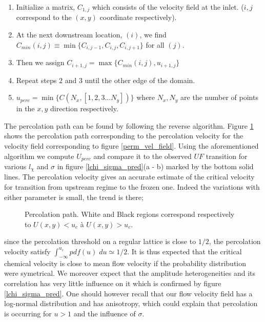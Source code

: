 \documentclass[doublecol]{epl2}
\def\figdir{./}
\begin{document}
\begin{enumerate}
 \item Initialize a matrix, $C_{1,j}$ which consists of the velocity field at the inlet. ($i,j$ correspond to the $(x,y)$ coordinate respectively).
 \item At the next downstream location, $(i)$, we find $C_{min}(i,j) \equiv \min\{C_{i,j-1},C_{i,j},C_{i,j+1}\}$ for all $(j)$.
 \item Then we assign $C_{i+1,j} = \max\{C_{min}(i,j) , u_{i+1,j}\}$
 \item Repeat steps $2$ and $3$ until the other edge of the domain.
 \item $u_{perc} = \min \{C(N_x,[1,2,3...N_y])\}$ where $N_x, N_y$ are the number of points in the $x,y$ direction respectively.
\end{enumerate}
The percolation path can be found by following the reverse algorithm.
Figure \ref{perc_path} shows the percolation path corresponding to the percolation velocity for the velocity field corresponding to figure \ref{perm_vel_field}. Using the aforementioned algorithm we compute $U_{perc}$ and compare it to the observed $UF$ transition for various $l_\chi$ and $\sigma$ in figure \ref{lchi_sigma_pred}(a - b) marked by the bottom solid lines. The percolation velocity gives an accurate estimate of the critical velocity for transition from upstream regime to the frozen one. Indeed the variations with either parameter is small, the trend is there;
\begin{figure}
 \onefigure[width=0.99\hsize]{\figdir/percolation_path_casenum_1289}
        \caption{Percolation path. White and Black regions correspond respectively to $U(x,y)<u_c$ à $U(x,y)>u_c$.}
\label{perc_path}
\end{figure}
since the percolation threshold on a regular lattice is close to $1/2$, the percolation velocity satisfy $\int_{-\infty}^{u_c} pdf(u)\;du \simeq 1/2$.
It is thus expected that the critical chemical velocity is close to mean flow velocity if the probability distribution  were symetrical.
We moreover expect that the amplitude heterogeneities and its correlation has very little influence on it which is confirmed by figure \ref{lchi_sigma_pred}.
One should however recall that our flow  velocity field has a log-normal distribution and has anisotropy, which could explain that percolation is occurring for $u>1$ and the influence of $\sigma$.
\end{document}
